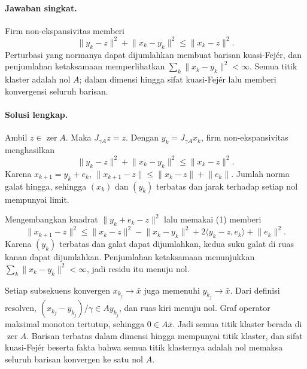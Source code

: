 \paragraph{Jawaban singkat.}
\label{orig03:ps05:answer:0005}
Firm non-ekspansivitas memberi
\[
 \lVert y_k-z\rVert^2+\lVert x_k-y_k\rVert^2
 \le\lVert x_k-z\rVert^2.
\]
Perturbasi yang normanya dapat dijumlahkan membuat barisan kuasi-Fej\'{e}r,
dan penjumlahan ketaksamaan memperlihatkan
$\sum_k\lVert x_k-y_k\rVert^2<\infty$. Semua titik klaster adalah nol $A$;
dalam dimensi hingga sifat kuasi-Fej\'{e}r lalu memberi konvergensi seluruh
barisan.

\paragraph{Solusi lengkap.}
\label{orig03:ps05:solution:0005}
Ambil $z\in\operatorname{zer}A$. Maka $J_{\gamma A}z=z$. Dengan
$y_k=J_{\gamma A}x_k$, firm non-ekspansivitas menghasilkan
\[
 \lVert y_k-z\rVert^2+\lVert x_k-y_k\rVert^2
 \le\lVert x_k-z\rVert^2.                                      \tag{1}
\]
Karena $x_{k+1}=y_k+e_k$,
$\lVert x_{k+1}-z\rVert\le\lVert x_k-z\rVert+\lVert e_k\rVert$.
Jumlah norma galat hingga, sehingga $(x_k)$ dan $(y_k)$ terbatas dan jarak
terhadap setiap nol mempunyai limit.

Mengembangkan kuadrat $\lVert y_k+e_k-z\rVert^2$ lalu memakai (1) memberi
\[
 \lVert x_{k+1}-z\rVert^2
 \le\lVert x_k-z\rVert^2-\lVert x_k-y_k\rVert^2
   +2\langle y_k-z,e_k\rangle+\lVert e_k\rVert^2.
\]
Karena $(y_k)$ terbatas dan galat dapat dijumlahkan, kedua suku galat di ruas
kanan dapat dijumlahkan. Penjumlahan ketaksamaan menunjukkan
$\sum_k\lVert x_k-y_k\rVert^2<\infty$, jadi residu itu menuju nol.

Setiap subsekuens konvergen $x_{k_j}\to\bar x$ juga memenuhi
$y_{k_j}\to\bar x$. Dari definisi resolven,
$(x_{k_j}-y_{k_j})/\gamma\in Ay_{k_j}$, dan ruas kiri menuju nol. Graf
operator maksimal monoton tertutup, sehingga $0\in A\bar x$. Jadi semua titik
klaster berada di $\operatorname{zer}A$. Barisan terbatas dalam dimensi hingga
mempunyai titik klaster, dan sifat kuasi-Fej\'{e}r beserta fakta bahwa semua
titik klasternya adalah nol memaksa seluruh barisan konvergen ke satu nol
$A$.
